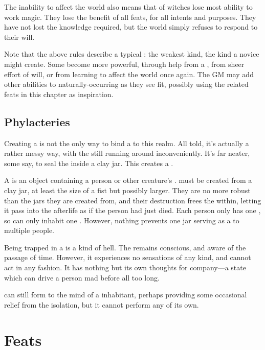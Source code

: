 The inability to affect the world also means that {\ghosts} of witches lose most ability to work magic.
They lose the benefit of all feats, for all intents and purposes.
They have not lost the knowledge required, but the world simply refuses to respond to their will.

Note that the above rules describe a typical {\ghost}: the weakest kind, the kind a novice  might create.
Some {\ghosts} become more powerful, through help from a , from sheer effort of will, or from learning to affect the world once again.
The GM may add other abilities to naturally-occurring {\ghosts} as they see fit, possibly using the {\ghost} related feats in this chapter as inspiration.

\subsection{Phylacteries}

Creating a {\ghost} is not the only way to bind a {\soul} to this realm.
All told, it's actually a rather messy way, with the {\soul} still running around inconveniently.
It's far neater, some  say, to seal the {\soul} inside a clay jar.
This creates a {\phylactery}.

A {\phylactery} is an object containing a person or other creature's {\soul}.
\capital{\phylacteries} must be created from a clay jar, at least the size of a fist but possibly larger.
They are no more robust than the jars they are created from, and their destruction frees the {\soul} within, letting it pass into the afterlife as if the person had just died.
Each person only has one {\soul}, so can only inhabit one {\phylactery}.
However, nothing prevents one jar serving as a {\phylactery} to multiple people.

Being trapped in a {\phylactery} is a kind of hell.
The {\soul} remains conscious, and aware of the passage of time.
However, it experiences no sensations of any kind, and cannot act in any fashion.
It has nothing but its own thoughts for company---a state which can drive a person mad before all too long.

 can still form {\interfaces} to the mind of a {\phylacterypossessive} inhabitant, perhaps providing some occasional relief from the isolation, but it cannot perform any  of its own.

\section{Feats}

